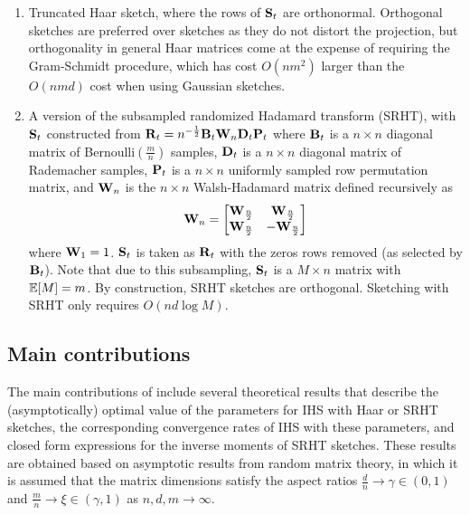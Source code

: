 \begin{enumerate}

\item
Truncated Haar sketch, where the rows of $\mathbf{S}_t$ are orthonormal. Orthogonal sketches are preferred over \iid sketches as they do not distort the projection, but orthogonality in general Haar matrices come at the expense of requiring the Gram-Schmidt procedure, which has cost $O(nm^2)$ larger than the $O(nmd)$ cost when using Gaussian sketches.

\item
A version of the subsampled randomized Hadamard transform (SRHT), with $\mathbf{S}_t$ constructed from $\mathbf{R}_t=n^{-\frac{1}{2}}\mathbf{B}_t\mathbf{W}_n\mathbf{D}_t\mathbf{P}_t$ where $\mathbf{B}_t$ is a $n\times n$ diagonal matrix of \iid Bernoulli$\left(\frac{m}{n}\right)$ samples, $\mathbf{D}_t$ is a $n\times n$ diagonal matrix of \iid Rademacher samples, $\mathbf{P}_t$ is a $n\times n$ uniformly sampled row permutation matrix, and $\mathbf{W}_n$ is the $n\times n$ Walsh-Hadamard matrix defined recursively as
\[
\mathbf{W}_n =
\begin{bmatrix}
\mathbf{W}_\frac{n}{2} & \mathbf{W}_\frac{n}{2} \\
\mathbf{W}_\frac{n}{2} & -\mathbf{W}_\frac{n}{2}
\end{bmatrix}
\]
where $\mathbf{W}_1=1$. $\mathbf{S}_t$ is taken as $\mathbf{R}_t$ with the zeros rows removed (as selected by $\mathbf{B}_t$). Note that due to this subsampling, $\mathbf{S}_t$ is a $M\times n$ matrix with $\mathbb{E}[M]=m$. By construction, SRHT sketches are orthogonal. Sketching with SRHT only requires $O(nd\log M)$.

\end{enumerate}


\subsection{Main contributions}

The main contributions of \citet{Lacotte:2020} include several theoretical results that describe the (asymptotically) optimal value of the parameters for IHS with Haar or SRHT sketches, the corresponding convergence rates of IHS with these parameters, and closed form expressions for the inverse moments of SRHT sketches. These results are obtained based on asymptotic results from random matrix theory, in which it is assumed that the matrix dimensions satisfy the aspect ratios $\frac{d}{n}\rightarrow\gamma\in(0,1)$ and $\frac{m}{n}\rightarrow\xi\in(\gamma,1)$ as $n,d,m\rightarrow\infty$.
\\

